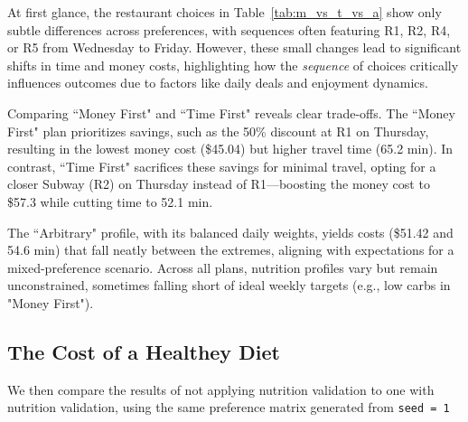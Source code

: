 \documentclass{article}
\begin{document}


At first glance, the restaurant choices in Table~\ref{tab:m_vs_t_vs_a} show only subtle differences across preferences, with sequences often featuring R1, R2, R4, or R5 from Wednesday to Friday. However, these small changes lead to significant shifts in time and money costs, highlighting how the \textit{sequence} of choices critically influences outcomes due to factors like daily deals and enjoyment dynamics.

Comparing ``Money First" and ``Time First" reveals clear trade-offs. The ``Money First" plan prioritizes savings, such as the 50\% discount at R1 on Thursday, resulting in the lowest money cost (\$45.04) but higher travel time (65.2 min). In contrast, ``Time First" sacrifices these savings for minimal travel, opting for a closer Subway (R2) on Thursday instead of R1---boosting the money cost to \$57.3 while cutting time to 52.1 min.

The ``Arbitrary" profile, with its balanced daily weights, yields costs (\$51.42 and 54.6 min) that fall neatly between the extremes, aligning with expectations for a mixed-preference scenario. Across all plans, nutrition profiles vary but remain unconstrained, sometimes falling short of ideal weekly targets (e.g., low carbs in "Money First").






\subsection{The Cost of a Healthey Diet}

We then compare the results of not applying nutrition validation to one with nutrition validation, using the same preference matrix generated from \texttt{seed = 1}
\end{document}
